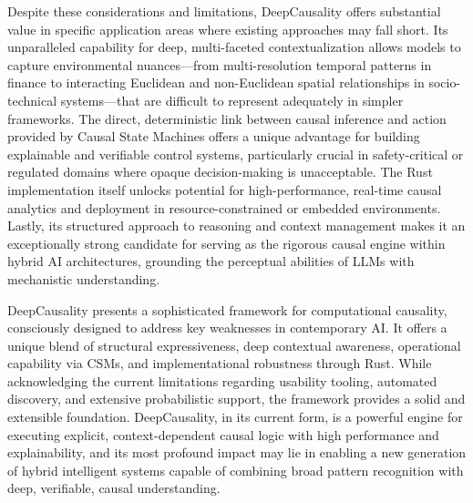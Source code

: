 Despite these considerations and limitations, DeepCausality offers substantial value in specific application areas where existing approaches may fall short. Its unparalleled capability for deep, multi-faceted contextualization allows models to capture environmental nuances—from multi-resolution temporal patterns in finance to interacting Euclidean and non-Euclidean spatial relationships in socio-technical systems—that are difficult to represent adequately in simpler frameworks. The direct, deterministic link between causal inference and action provided by Causal State Machines offers a unique advantage for building explainable and verifiable control systems, particularly crucial in safety-critical or regulated domains where opaque decision-making is unacceptable. The Rust implementation itself unlocks potential for high-performance, real-time causal analytics and deployment in resource-constrained or embedded environments. Lastly, its structured approach to reasoning and context management makes it an exceptionally strong candidate for serving as the rigorous causal engine within hybrid AI architectures, grounding the perceptual abilities of LLMs with mechanistic understanding.

DeepCausality presents a sophisticated framework for computational causality, consciously designed to address key weaknesses in contemporary AI. It offers a unique blend of structural expressiveness, deep contextual awareness, operational capability via CSMs, and implementational robustness through Rust. While acknowledging the current limitations regarding usability tooling, automated discovery, and extensive probabilistic support, the framework provides a solid and extensible foundation. DeepCausality, in its current form, is a powerful engine for executing explicit, context-dependent causal logic with high performance and explainability, and its most profound impact may lie in enabling a new generation of hybrid intelligent systems capable of combining broad pattern recognition with deep, verifiable, causal understanding.

